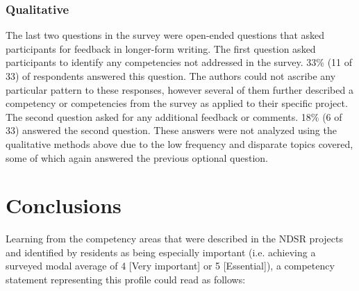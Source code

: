\documentclass{acm_proc_article-sp}
\begin{document}
\subsubsection{Qualitative}
The last two questions in the survey were open-ended questions that asked participants for feedback in longer-form writing. The first question asked participants to identify any competencies not addressed in the survey. 33\% (11 of 33) of respondents answered this question. The authors could not ascribe any particular pattern to these responses, however several of them further described a competency or competencies from the survey as applied to their specific project. The second question asked for any additional feedback or comments. 18\% (6 of 33) answered the second question. These answers were not analyzed using the qualitative methods above due to the low frequency and disparate topics covered, some of which again answered the previous optional question. 

\section{Conclusions}
Learning from the competency areas that were described in the NDSR projects and identified by residents as being especially important (i.e. achieving a surveyed modal average of 4 [Very important] or 5 [Essential]), a competency statement representing this profile could read as follows:
\end{document}
